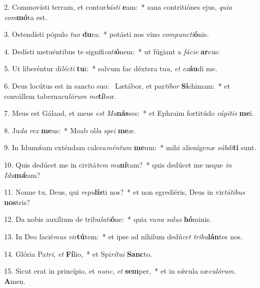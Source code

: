 2. Commovísti terram, et contur\textit{bás}\textit{ti} \textbf{e}am:~*  sana contritiónes ejus, \textit{qui}\textit{a} \textit{com}\textbf{mó}ta est.\

3. Ostendísti pópulo \textit{tu}\textit{o} \textbf{du}ra:~*  potásti nos vino \textit{com}\textit{punc}\textit{ti}\textbf{ó}nis.\

4. Dedísti metuéntibus te signifi\textit{ca}\textit{ti}\textbf{ó}nem:~*  ut fúgiant a \textit{fá}\textit{ci}\textit{e} \textbf{ar}cus:\

5. Ut liberéntur di\textit{léc}\textit{ti} \textbf{tu}i:~*  salvum fac déxtera tu\textit{a}, \textit{et} \textit{ex}\textbf{áu}di me.\

6. Deus locútus est in sancto suo: \dag\  Lætábor, et par\textit{tí}\textit{bor} \textbf{Sí}chimam:~*  et convállem tabernacu\textit{ló}\textit{rum} \textit{me}\textbf{tí}bor.\

7. Meus est Gálaad, et meus \textit{est} \textit{Ma}\textbf{nás}ses:~*  et Ephraim fortitúdo \textit{cá}\textit{pi}\textit{tis} \textbf{me}i.\

8. Ju\textit{da} \textit{rex} \textbf{me}us:~*  Moab ol\textit{la} \textit{spe}\textit{i} \textbf{me}æ.\

9. In Idumǽam exténdam calcea\textit{mén}\textit{tum} \textbf{me}um:~*  mihi alieníge\textit{næ} \textit{súb}\textit{di}\textbf{ti} sunt.\

10. Quis dedúcet me in civitá\textit{tem} \textit{mu}\textbf{ní}tam?~*  quis dedúcet me usque \textit{in} \textit{I}\textit{du}\textbf{mǽ}am?\

11. Nonne tu, Deus, qui \textit{re}\textit{pu}\textbf{lís}ti nos?~*  et non egrediéris, Deus in vir\textit{tú}\textit{ti}\textit{bus} \textbf{nos}tris?\

12. Da nobis auxílium de tribu\textit{la}\textit{ti}\textbf{ó}ne:~*  quia va\textit{na} \textit{sa}\textit{lus} \textbf{hó}minis.\

13. In Deo facié\textit{mus} \textit{vir}\textbf{tú}tem:~*  et ipse ad níhilum dedú\textit{cet} \textit{tri}\textit{bu}\textbf{lán}tes nos.\

14. Glória Pa\textit{tri}, \textit{et} \textbf{Fí}lio,~*  et Spi\textit{rí}\textit{tu}\textit{i} \textbf{Sanc}to.\

15. Sicut erat in princípio, et \textit{nunc}, \textit{et} \textbf{sem}per,~*  et in sǽcula sæ\textit{cu}\textit{ló}\textit{rum}. \textbf{A}men.\

